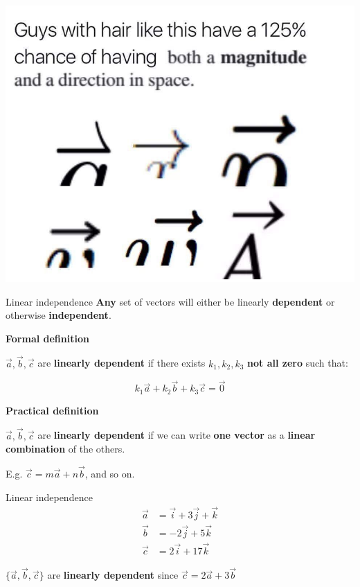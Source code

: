 \documentclass{beamer}
\begin{document}
\begin{frame}
	\includegraphics[width = \linewidth]{img/vector_meme.jpg}
\end{frame}

\begin{frame}{Linear independence}
	\textbf{Any} set of vectors will either be linearly \textbf{dependent} or otherwise \textbf{independent}.
	
	\textbf{Formal definition}
	
	$\vec{a}, \vec{b}, \vec{c}$ are \textbf{linearly dependent} if there exists $k_1, k_2, k_3$ \textbf{not all zero} such that:
	
	$$k_1\vec{a} + k_2\vec{b} + k_3\vec{c} = \vec{0}$$
	
	\textbf{Practical definition}
	
	$\vec{a}, \vec{b}, \vec{c}$ are \textbf{linearly dependent} if we can write \textbf{one vector} as a \textbf{linear combination} of the others.
	
	E.g. $\vec{c} = m\vec{a} + n\vec{b}$, and so on.
\end{frame}

\begin{frame}{Linear independence}
	\begin{align*}
		\vec{a} &= \vec{i} + 3\vec{j} + \vec{k}\\
		\vec{b} &= -2\vec{j} + 5\vec{k}\\
		\vec{c} &= 2\vec{i} + 17\vec{k}
	\end{align*}
	
	$\{\vec{a}, \vec{b}, \vec{c}\}$ are \textbf{linearly dependent} since
	$\vec{c} = 2\vec{a} + 3\vec{b}$
\end{frame}
\end{document}
